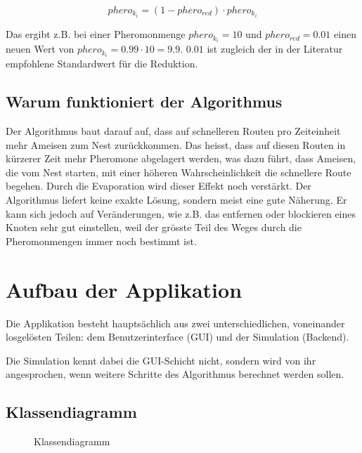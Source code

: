 \[ phero_{k_i} = (1 - phero_{red}) \cdot phero_{k_i} \]

\noindent Das ergibt z.B. bei einer Pheromonmenge $phero_{k_i} = 10$ und
$phero_{red} = 0.01$ einen neuen Wert von $phero_{k_i} = 0.99 \cdot 10 = 9.9$.
$0.01$ ist zugleich der in der Literatur empfohlene Standardwert für die
Reduktion.

\subsection{Warum funktioniert der Algorithmus}

Der Algorithmus baut darauf auf, dass auf schnelleren Routen pro Zeiteinheit
mehr Ameisen zum Nest zurückkommen. Das heisst, dass auf diesen Routen in
kürzerer Zeit mehr Pheromone abgelagert werden, was dazu führt, dass Ameisen,
die vom Nest starten, mit einer höheren Wahrscheinlichkeit die schnellere Route
begehen. Durch die Evaporation wird dieser Effekt noch verstärkt. Der
Algorithmus liefert keine exakte Lösung, sondern meist eine gute Näherung. Er
kann sich jedoch auf Veränderungen, wie z.B. das entfernen oder blockieren eines
Knoten sehr gut einstellen, weil der grösste Teil des Weges durch die
Pheromonmengen immer noch bestimmt ist.

\section{Aufbau der Applikation}

Die Applikation besteht hauptsächlich aus zwei unterschiedlichen, voneinander
losgelösten Teilen: dem Benutzerinterface (GUI) und der Simulation (Backend).

Die Simulation kennt dabei die GUI-Schicht nicht, sondern wird von ihr
angesprochen, wenn weitere Schritte des Algorithmus berechnet werden sollen.

\pagebreak \subsection{Klassendiagramm}

\begin{figure}[h] \centering {}
\caption{Klassendiagramm} \end{figure}

